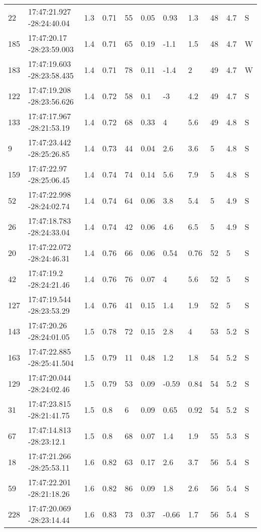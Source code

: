 \begin{deluxetable}[htp]
\begin{tabular}{lllllllllll}
22 & 17:47:21.927 -28:24:40.04 & 1.3 & 0.71 & 55 & 0.05 & 0.93 & 1.3 & 48 & 4.7\ee{24} & S \\
185 & 17:47:20.17 -28:23:59.003 & 1.4 & 0.71 & 65 & 0.19 & -1.1 & 1.5 & 48 & 4.7\ee{24} & W \\
183 & 17:47:19.603 -28:23:58.435 & 1.4 & 0.71 & 78 & 0.11 & -1.4 & 2 & 49 & 4.7\ee{24} & W \\
122 & 17:47:19.208 -28:23:56.626 & 1.4 & 0.72 & 58 & 0.1 & -3 & 4.2 & 49 & 4.7\ee{24} & S \\
133 & 17:47:17.967 -28:21:53.19 & 1.4 & 0.72 & 68 & 0.33 & 4 & 5.6 & 49 & 4.8\ee{24} & S \\
9 & 17:47:23.442 -28:25:26.85 & 1.4 & 0.73 & 44 & 0.04 & 2.6 & 3.6 & 5 & 4.8\ee{24} & S \\
159 & 17:47:22.97 -28:25:06.45 & 1.4 & 0.74 & 74 & 0.14 & 5.6 & 7.9 & 5 & 4.8\ee{24} & S \\
52 & 17:47:22.998 -28:24:02.74 & 1.4 & 0.74 & 64 & 0.06 & 3.8 & 5.4 & 5 & 4.9\ee{24} & S \\
26 & 17:47:18.783 -28:24:33.04 & 1.4 & 0.74 & 42 & 0.06 & 4.6 & 6.5 & 5 & 4.9\ee{24} & S \\
20 & 17:47:22.072 -28:24:46.31 & 1.4 & 0.76 & 66 & 0.06 & 0.54 & 0.76 & 52 & 5\ee{24} & S \\
42 & 17:47:19.2 -28:24:21.46 & 1.4 & 0.76 & 76 & 0.07 & 4 & 5.6 & 52 & 5\ee{24} & S \\
127 & 17:47:19.544 -28:23:53.29 & 1.4 & 0.76 & 41 & 0.15 & 1.4 & 1.9 & 52 & 5\ee{24} & S \\
143 & 17:47:20.26 -28:24:01.05 & 1.5 & 0.78 & 72 & 0.15 & 2.8 & 4 & 53 & 5.2\ee{24} & S \\
163 & 17:47:22.885 -28:25:41.504 & 1.5 & 0.79 & 11 & 0.48 & 1.2 & 1.8 & 54 & 5.2\ee{24} & S \\
129 & 17:47:20.044 -28:24:02.46 & 1.5 & 0.79 & 53 & 0.09 & -0.59 & 0.84 & 54 & 5.2\ee{24} & S \\
31 & 17:47:23.815 -28:21:41.75 & 1.5 & 0.8 & 6 & 0.09 & 0.65 & 0.92 & 54 & 5.2\ee{24} & S \\
67 & 17:47:14.813 -28:23:12.1 & 1.5 & 0.8 & 68 & 0.07 & 1.4 & 1.9 & 55 & 5.3\ee{24} & S \\
18 & 17:47:21.266 -28:25:53.11 & 1.6 & 0.82 & 63 & 0.17 & 2.6 & 3.7 & 56 & 5.4\ee{24} & S \\
59 & 17:47:22.201 -28:21:18.26 & 1.6 & 0.82 & 86 & 0.09 & 1.8 & 2.6 & 56 & 5.4\ee{24} & S \\
228 & 17:47:20.069 -28:23:14.44 & 1.6 & 0.83 & 73 & 0.37 & -0.66 & 1.7 & 56 & 5.4\ee{24} & S \\

\end{tabular}
\end{deluxetable}
